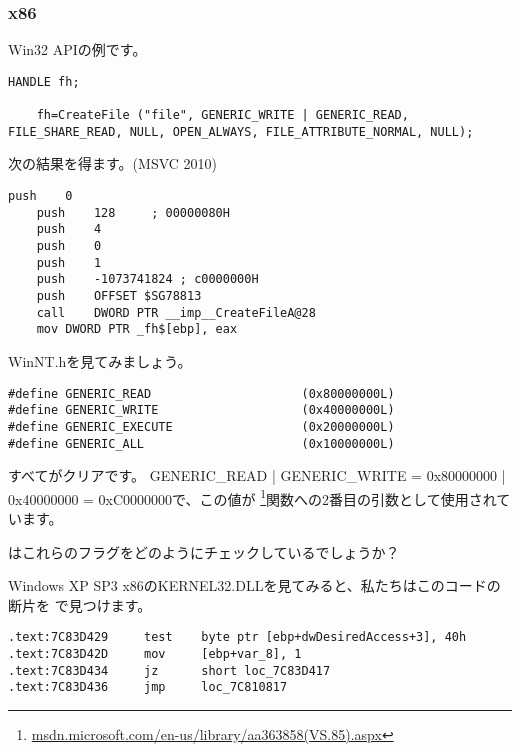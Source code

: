 ﻿\subsubsection{x86}

Win32 APIの例です。

\begin{lstlisting}[style=customc]
	HANDLE fh;

	fh=CreateFile ("file", GENERIC_WRITE | GENERIC_READ, FILE_SHARE_READ, NULL, OPEN_ALWAYS, FILE_ATTRIBUTE_NORMAL, NULL);
\end{lstlisting}

次の結果を得ます。(MSVC 2010)

\begin{lstlisting}[caption=MSVC 2010,style=customasmx86]
	push	0
	push	128		; 00000080H
	push	4
	push	0
	push	1
	push	-1073741824	; c0000000H
	push	OFFSET $SG78813
	call	DWORD PTR __imp__CreateFileA@28
	mov	DWORD PTR _fh$[ebp], eax
\end{lstlisting}

WinNT.hを見てみましょう。

\begin{lstlisting}[caption=WinNT.h,style=customc]
#define GENERIC_READ                     (0x80000000L)
#define GENERIC_WRITE                    (0x40000000L)
#define GENERIC_EXECUTE                  (0x20000000L)
#define GENERIC_ALL                      (0x10000000L)
\end{lstlisting}

すべてがクリアです。
GENERIC\_READ | GENERIC\_WRITE = 0x80000000 | 0x40000000 = 0xC0000000で、この値が
\footnote{\href{http://msdn.microsoft.com/en-us/library/aa363858(VS.85).aspx}{msdn.microsoft.com/en-us/library/aa363858(VS.85).aspx}}関数への2番目の引数として使用されています。

 はこれらのフラグをどのようにチェックしているでしょうか？

Windows XP SP3 x86のKERNEL32.DLLを見てみると、私たちはこのコードの断片を  で見つけます。

\begin{lstlisting}[caption=KERNEL32.DLL (Windows XP SP3 x86),style=customasmx86]
.text:7C83D429     test    byte ptr [ebp+dwDesiredAccess+3], 40h
.text:7C83D42D     mov     [ebp+var_8], 1
.text:7C83D434     jz      short loc_7C83D417
.text:7C83D436     jmp     loc_7C810817
\end{lstlisting}


